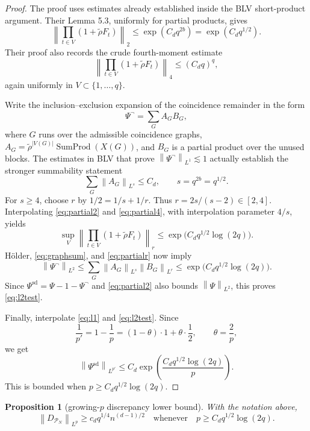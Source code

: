 \documentclass[11pt]{article}
\newtheorem{proposition}{Proposition}
\newcommand{\norm}[2]{\left\lVert #1\right\rVert_{#2}}
\begin{document}
\begin{proof}
The proof uses estimates already established inside the BLV short-product
argument.  Their Lemma 5.3, uniformly for partial products, gives
\begin{equation}\label{eq:partial2}
 \left\lVert\prod_{t\in V}(1+\widetilde\rho F_t)\right\rVert_2
 \leq \exp(C_d q^{2b})=\exp(C_d q^{1/2}).
\end{equation}
Their proof also records the crude fourth-moment estimate
\begin{equation}\label{eq:partial4}
 \left\lVert\prod_{t\in V}(1+\widetilde\rho F_t)\right\rVert_4
 \leq (C_dq)^q,
\end{equation}
again uniformly in $V\subset\{1,\ldots,q\}$.

Write the inclusion--exclusion expansion of the coincidence remainder in the
form
\[
 \Psi^{\neg}=\sum_G A_G B_G,
\]
where $G$ runs over the admissible coincidence graphs,
$A_G=\widetilde\rho^{|V(G)|}\operatorname{SumProd}(X(G))$, and $B_G$
is a partial product over the unused blocks.  The estimates in BLV that prove
$\norm{\Psi^{\neg}}{L^1}\lesssim1$ actually establish the stronger summability
statement
\begin{equation}\label{eq:graphsum}
 \sum_G\norm{A_G}{L^s}\leq C_d,
 \qquad s=q^{2b}=q^{1/2}.
\end{equation}
For $s\geq4$, choose $r$ by $1/2=1/s+1/r$.  Thus
$r=2s/(s-2)\in[2,4]$.  Interpolating \eqref{eq:partial2} and
\eqref{eq:partial4}, with interpolation parameter $4/s$, yields
\begin{equation}\label{eq:partialr}
 \sup_V\left\lVert\prod_{t\in V}(1+\widetilde\rho F_t)\right\rVert_r
 \leq \exp\!\bigl(C_d q^{1/2}\log(2q)\bigr).
\end{equation}
H\"older, \eqref{eq:graphsum}, and \eqref{eq:partialr} now imply
\[
 \norm{\Psi^{\neg}}{L^2}
 \leq \sum_G\norm{A_G}{L^s}\norm{B_G}{L^r}
 \leq \exp\!\bigl(C_d q^{1/2}\log(2q)\bigr).
\]
Since $\Psi^{\mathrm{sd}}=\Psi-1-\Psi^{\neg}$ and
\eqref{eq:partial2} also bounds $\norm{\Psi}{L^2}$, this proves
\eqref{eq:l2test}.

Finally, interpolate \eqref{eq:l1} and \eqref{eq:l2test}.  Since
\[
 \frac1{p'}=1-\frac1p=(1-\theta)\cdot1+\theta\cdot\frac12,
 \qquad \theta=\frac2p,
\]
we get
\[
 \norm{\Psi^{\mathrm{sd}}}{L^{p'}}
 \leq C_d\exp\!\left(\frac{C_dq^{1/2}\log(2q)}p\right).
\]
This is bounded when $p\geq C_dq^{1/2}\log(2q)$.
\end{proof}

\begin{proposition}[growing-$p$ discrepancy lower bound]\label{prop:lp}
With the notation above,
\begin{equation}\label{eq:lp}
 \norm{D_{\mathcal P_N}}{L^p}
 \geq c_dq^{1/4}n^{(d-1)/2}
 \quad\text{whenever}\quad
 p\geq C_dq^{1/2}\log(2q).
\end{equation}
\end{proposition}
\end{document}
